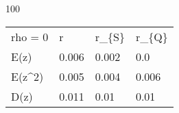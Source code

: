 
100
\begin{tabular}{llll}
\hline
 rho = 0 & r     & r\_\{S\} & r\_\{Q\} \\
 E(z)    & 0.006 & 0.002 & 0.0   \\
 E(z\^{}2)  & 0.005 & 0.004 & 0.006 \\
 D(z)    & 0.011 & 0.01  & 0.01  \\
\hline
\end{tabular}